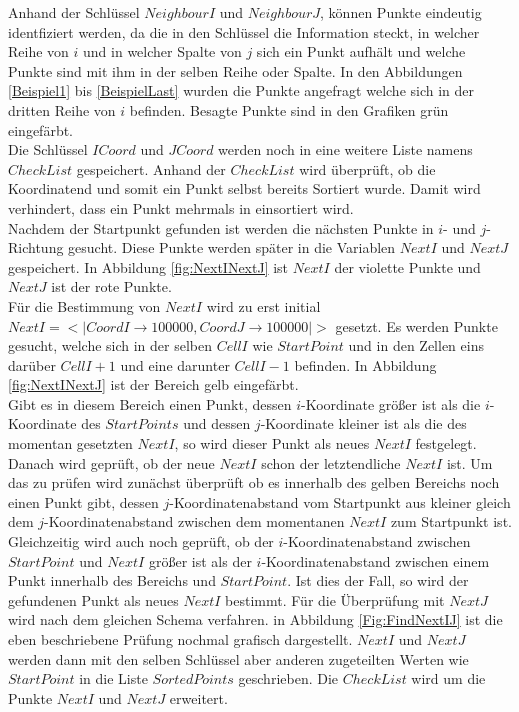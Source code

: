 Anhand der Schlüssel $NeighbourI$ und $NeighbourJ$, können Punkte eindeutig identfiziert werden, da die in den Schlüssel die Information steckt, in welcher Reihe von $i$ und in welcher Spalte von $j$ sich ein Punkt aufhält und welche Punkte sind mit ihm in der selben Reihe oder Spalte. In den Abbildungen \ref{Beispiel1} bis \ref{BeispielLast} wurden die Punkte angefragt welche sich in der dritten Reihe von $i$ befinden. Besagte Punkte sind in den Grafiken grün eingefärbt.\\

Die Schlüssel $ICoord$ und $JCoord$ werden noch in eine weitere Liste namens $CheckList$ gespeichert. Anhand der $CheckList$ wird überprüft, ob die Koordinatend und somit ein Punkt selbst bereits Sortiert wurde. Damit wird verhindert, dass ein Punkt mehrmals in einsortiert wird.\\
 
Nachdem der Startpunkt gefunden ist werden die nächsten Punkte in $i$- und $j$-Richtung gesucht. Diese Punkte werden später in die Variablen $NextI$ und $NextJ$ gespeichert. In Abbildung \ref{fig:NextINextJ} ist $NextI$ der violette Punkte und $NextJ$ ist der rote Punkte. \\

Für die Bestimmung von $NextI$ wird zu erst initial $NextI = <|CoordI \rightarrow 100 000, CoordJ \rightarrow 100 000|>$ gesetzt. Es werden Punkte gesucht, welche sich in der selben $CellI$ wie $StartPoint$ und in den Zellen eins darüber $CellI +1$ und eine darunter $CellI-1$ befinden. In Abbildung \ref{fig:NextINextJ} ist der Bereich gelb eingefärbt.\\

Gibt es in diesem Bereich einen Punkt, dessen $i$-Koordinate größer ist als die $i$-Koordinate des $StartPoints$ und dessen $j$-Koordinate kleiner ist als die des momentan gesetzten $NextI$, so wird dieser Punkt als neues $NextI$ festgelegt. Danach wird geprüft, ob der neue $NextI$ schon der letztendliche $NextI$ ist. Um das zu prüfen wird zunächst überprüft ob es innerhalb des gelben Bereichs noch einen Punkt gibt, dessen $j$-Koordinatenabstand vom Startpunkt aus kleiner gleich dem $j$-Koordinatenabstand zwischen dem momentanen $NextI$ zum Startpunkt ist. Gleichzeitig wird auch noch geprüft, ob der $i$-Koordinatenabstand zwischen $StartPoint$ und $NextI$ größer ist als der $i$-Koordinatenabstand zwischen einem Punkt innerhalb des Bereichs und $StartPoint$. Ist dies der Fall, so wird der gefundenen Punkt als neues $NextI$ bestimmt. Für die Überprüfung mit $NextJ$ wird nach dem gleichen Schema verfahren. in Abbildung \ref{Fig:FindNextIJ} ist die eben beschriebene Prüfung nochmal grafisch dargestellt. $NextI$ und $NextJ$ werden dann mit den selben Schlüssel aber anderen zugeteilten Werten wie $StartPoint$ in die Liste $SortedPoints$ geschrieben. Die $CheckList$ wird um die Punkte $NextI$ und $NextJ$ erweitert.


